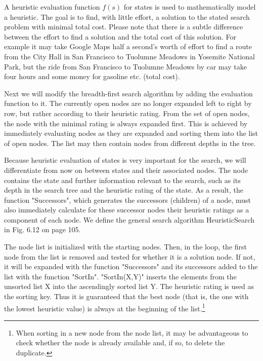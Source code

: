 \documentclass[10pt]{book}
\begin{document}
A heuristic evaluation function $f(s)$ for states is used to mathematically model a heuristic. The goal is to find, with little effort, a solution to the stated search problem with minimal total cost. Please note that there is a subtle difference between the effort to find a solution and the total cost of this solution. For example it may take Google Maps half a second's worth of effort to find a route from the City Hall in San Francisco to Tuolumne Meadows in Yosemite National Park, but the ride from San Francisco to Tuolumne Meadows by car may take four hours and some money for gasoline etc. (total cost).

Next we will modify the breadth-first search algorithm by adding the evaluation function to it. The currently open nodes are no longer expanded left to right by row, but rather according to their heuristic rating. From the set of open nodes, the node with the minimal rating is always expanded first. This is achieved by immediately evaluating nodes as they are expanded and sorting them into the list of open nodes. The list may then contain nodes from different depths in the tree.

Because heuristic evaluation of states is very important for the search, we will differentiate from now on between states and their associated nodes. The node contains the state and further information relevant to the search, such as its depth in the search tree and the heuristic rating of the state. As a result, the function "Successors", which generates the successors (children) of a node, must also immediately calculate for these successor nodes their heuristic ratings as a component of each node. We define the general search algorithm HeuristicSearch in Fig. 6.12 on page 105.

The node list is initialized with the starting nodes. Then, in the loop, the first node from the list is removed and tested for whether it is a solution node. If not, it will be expanded with the function "Successors" and its successors added to the list with the function "SortIn". "SortIn(X,Y)" inserts the elements from the unsorted list X into the ascendingly sorted list Y. The heuristic rating is used as the sorting key. Thus it is guaranteed that the best node (that is, the one with the lowest heuristic value) is always at the beginning of the list.\footnote{When sorting in a new node from the node list, it may be advantageous to check whether the node is already available and, if so, to delete the duplicate.}
\end{document}
